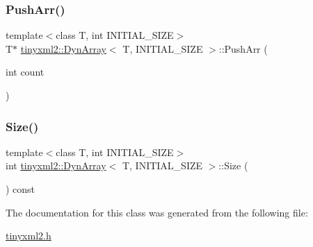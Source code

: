 \mbox{\label{classtinyxml2_1_1_dyn_array_ad289abee8cd02b26e215f1b63d2043f1}} 
\subsubsection{\texorpdfstring{Push\+Arr()}{PushArr()}}
{\footnotesize\ttfamily template$<$class T, int I\+N\+I\+T\+I\+A\+L\+\_\+\+S\+I\+ZE$>$ \\
T$\ast$ \hyperlink{classtinyxml2_1_1_dyn_array}{tinyxml2\+::\+Dyn\+Array}$<$ T, I\+N\+I\+T\+I\+A\+L\+\_\+\+S\+I\+ZE $>$\+::Push\+Arr (\begin{DoxyParamCaption}\item[{int}]{count }\end{DoxyParamCaption})\hspace{0.3cm}{\ttfamily [inline]}}

\mbox{\label{classtinyxml2_1_1_dyn_array_a67614d80847eb92cab330f1a5849a9a2}} 
\subsubsection{\texorpdfstring{Size()}{Size()}}
{\footnotesize\ttfamily template$<$class T, int I\+N\+I\+T\+I\+A\+L\+\_\+\+S\+I\+ZE$>$ \\
int \hyperlink{classtinyxml2_1_1_dyn_array}{tinyxml2\+::\+Dyn\+Array}$<$ T, I\+N\+I\+T\+I\+A\+L\+\_\+\+S\+I\+ZE $>$\+::Size (\begin{DoxyParamCaption}{ }\end{DoxyParamCaption}) const\hspace{0.3cm}{\ttfamily [inline]}}



The documentation for this class was generated from the following file\+:\begin{DoxyCompactItemize}
\item 
\hyperlink{tinyxml2_8h}{tinyxml2.\+h}\end{DoxyCompactItemize}

